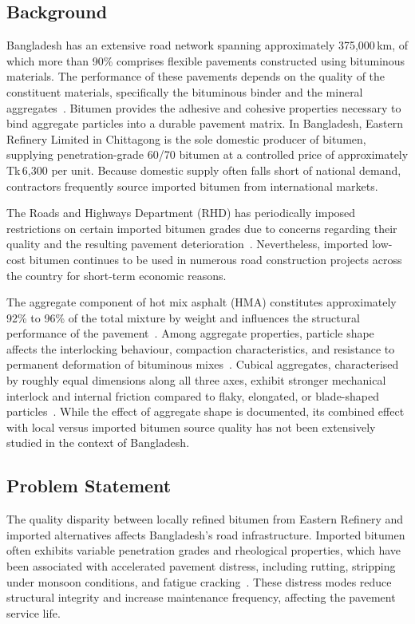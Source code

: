 \documentclass[12pt,a4paper]{article}
\begin{document}
\subsection{Background}

Bangladesh has an extensive road network spanning approximately 375,000\,km, of which more than 90\% comprises flexible pavements constructed using bituminous materials. The performance of these pavements depends on the quality of the constituent materials, specifically the bituminous binder and the mineral aggregates~\cite{werkineh2020assessment}. Bitumen provides the adhesive and cohesive properties necessary to bind aggregate particles into a durable pavement matrix. In Bangladesh, Eastern Refinery Limited in Chittagong is the sole domestic producer of bitumen, supplying penetration-grade 60/70 bitumen at a controlled price of approximately Tk\,6,300 per unit. Because domestic supply often falls short of national demand, contractors frequently source imported bitumen from international markets.

The Roads and Highways Department (RHD) has periodically imposed restrictions on certain imported bitumen grades due to concerns regarding their quality and the resulting pavement deterioration~\cite{imran2025developing}. Nevertheless, imported low-cost bitumen continues to be used in numerous road construction projects across the country for short-term economic reasons.

The aggregate component of hot mix asphalt (HMA) constitutes approximately 92\% to 96\% of the total mixture by weight and influences the structural performance of the pavement~\cite{rajkumar2018experimental}. Among aggregate properties, particle shape affects the interlocking behaviour, compaction characteristics, and resistance to permanent deformation of bituminous mixes~\cite{teja2020effect}. Cubical aggregates, characterised by roughly equal dimensions along all three axes, exhibit stronger mechanical interlock and internal friction compared to flaky, elongated, or blade-shaped particles~\cite{sumanth2017study}. While the effect of aggregate shape is documented, its combined effect with local versus imported bitumen source quality has not been extensively studied in the context of Bangladesh.

\subsection{Problem Statement}

The quality disparity between locally refined bitumen from Eastern Refinery and imported alternatives affects Bangladesh's road infrastructure. Imported bitumen often exhibits variable penetration grades and rheological properties, which have been associated with accelerated pavement distress, including rutting, stripping under monsoon conditions, and fatigue cracking~\cite{khairandish2020influence}. These distress modes reduce structural integrity and increase maintenance frequency, affecting the pavement service life.
\end{document}
